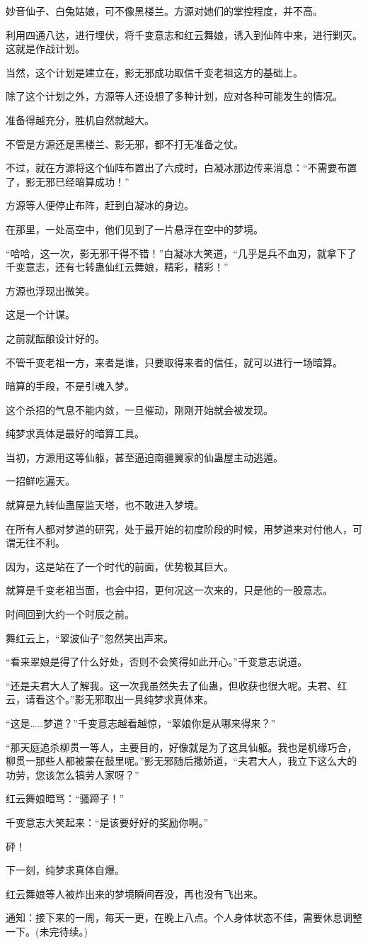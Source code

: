 \begin{this_body}
妙音仙子、白兔姑娘，可不像黑楼兰。方源对她们的掌控程度，并不高。

利用四通八达，进行埋伏，将千变意志和红云舞娘，诱入到仙阵中来，进行剿灭。这就是作战计划。

当然，这个计划是建立在，影无邪成功取信千变老祖这方的基础上。

除了这个计划之外，方源等人还设想了多种计划，应对各种可能发生的情况。

准备得越充分，胜机自然就越大。

不管是方源还是黑楼兰、影无邪，都不打无准备之仗。

不过，就在方源将这个仙阵布置出了六成时，白凝冰那边传来消息：“不需要布置了，影无邪已经暗算成功！”

方源等人便停止布阵，赶到白凝冰的身边。

在那里，一处高空中，他们见到了一片悬浮在空中的梦境。

“哈哈，这一次，影无邪干得不错！”白凝冰大笑道，“几乎是兵不血刃，就拿下了千变意志，还有七转蛊仙红云舞娘，精彩，精彩！”

方源也浮现出微笑。

这是一个计谋。

之前就酝酿设计好的。

不管千变老祖一方，来者是谁，只要取得来者的信任，就可以进行一场暗算。

暗算的手段，不是引魂入梦。

这个杀招的气息不能内敛，一旦催动，刚刚开始就会被发现。

纯梦求真体是最好的暗算工具。

当初，方源用这等仙躯，甚至逼迫南疆翼家的仙蛊屋主动逃遁。

一招鲜吃遍天。

就算是九转仙蛊屋监天塔，也不敢进入梦境。

在所有人都对梦道的研究，处于最开始的初度阶段的时候，用梦道来对付他人，可谓无往不利。

因为，这是站在了一个时代的前面，优势极其巨大。

就算是千变老祖当面，也会中招，更何况这一次来的，只是他的一股意志。

时间回到大约一个时辰之前。

舞红云上，“翠波仙子”忽然笑出声来。

“看来翠娘是得了什么好处，否则不会笑得如此开心。”千变意志说道。

“还是夫君大人了解我。这一次我虽然失去了仙蛊，但收获也很大呢。夫君、红云，请看这个。”影无邪取出一具纯梦求真体来。

“这是……梦道？”千变意志越看越惊，“翠娘你是从哪来得来？”

“那天庭追杀柳贯一等人，主要目的，好像就是为了这具仙躯。我也是机缘巧合，柳贯一那些人都被蒙在鼓里呢。”影无邪随后撒娇道，“夫君大人，我立下这么大的功劳，您该怎么犒劳人家呀？”

红云舞娘暗骂：“骚蹄子！”

千变意志大笑起来：“是该要好好的奖励你啊。”

砰！

下一刻，纯梦求真体自爆。

红云舞娘等人被炸出来的梦境瞬间吞没，再也没有飞出来。

通知：接下来的一周，每天一更，在晚上八点。个人身体状态不佳，需要休息调整一下。(未完待续。)

\end{this_body}

